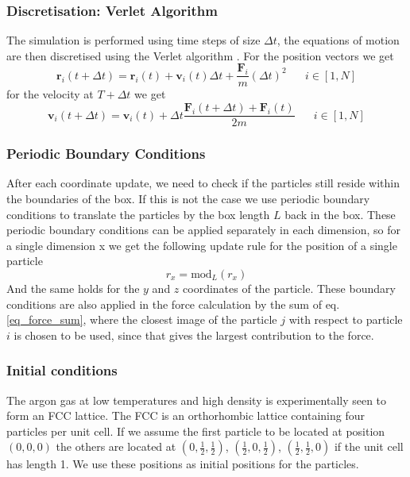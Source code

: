 \documentclass[twoside]{article}
\begin{document}
	\subsubsection*{Discretisation: Verlet Algorithm}
	
	The simulation is performed using time steps of size $\Delta t$, the equations of motion are then discretised using the Verlet algorithm \cite{ref_verlet}. For the position vectors we get
	\begin{equation}\label{eq_verlet_pos}
	\mathbf{r}_i(t+\Delta t) = \mathbf{r}_i(t) + \mathbf{v}_i(t)\Delta t + \frac{\mathbf{F}_i}{m}(\Delta t) ^2  \hspace{20pt} i\in [1, N]
	\end{equation}
	for the velocity at $T+\Delta t$ we get
	\begin{equation}\label{eq_verlet_vel}
	\mathbf{v}_i(t+\Delta t) = \mathbf{v}_i(t) + \Delta t \frac{\mathbf{F}_i(t + \Delta t) + \mathbf{F}_i(t)}{2m}  \hspace{20pt} i\in [1, N]
	\end{equation}
	
	\subsubsection*{Periodic Boundary Conditions}
	After each coordinate update, we need to check if the particles still reside within the boundaries of the box. If this is not the case we use periodic boundary conditions to translate the particles by the box length $L$ back in the box. These periodic boundary conditions can be applied separately in each dimension, so for a single dimension x we get the following update rule for the position of a single particle
	\begin{equation}\label{eq_pbc}
	r_x = \text{mod}_L(r_x)
	\end{equation}
	And the same holds for the $y$ and $z$ coordinates of the particle. These boundary conditions are also applied in the force calculation by the sum of eq.\ref{eq_force_sum}, where the closest image of the particle $j$ with respect to particle $i$ is chosen to be used, since that gives the largest contribution to the force. 
	
	
	\subsubsection*{Initial conditions}
	The argon gas at low temperatures and high density is experimentally seen to form an FCC lattice. The FCC is an orthorhombic lattice containing four particles per unit cell. If we assume the first particle to be located at position $(0,0,0)$ the others are located at $(0,\frac{1}{2},\frac{1}{2})$, $(\frac{1}{2},0,\frac{1}{2})$, $(\frac{1}{2},\frac{1}{2},0)$ if the unit cell has length 1. We use these positions as initial positions for the particles.
	
\end{document}
